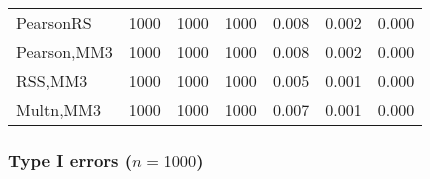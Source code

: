 \documentclass[
]{article}
\begin{document}
\begin{table}[H]
{\begin{tabular}[t]{lrrrrrr}
\hspace{1em}PearsonRS & 1000 & 1000 & 1000 & 0.008 & 0.002 & 0.000\\
\hspace{1em}Pearson,MM3 & 1000 & 1000 & 1000 & 0.008 & 0.002 & 0.000\\
\hspace{1em}RSS,MM3 & 1000 & 1000 & 1000 & 0.005 & 0.001 & 0.000\\
\hspace{1em}Multn,MM3 & 1000 & 1000 & 1000 & 0.007 & 0.001 & 0.000\\
\bottomrule
\end{tabular}}
\end{table}

\hypertarget{type-i-errors-n1000-3}{%
\subsubsection{\texorpdfstring{Type I errors
(\(n=1000\))}{Type I errors (n=1000)}}\label{type-i-errors-n1000-3}}
\end{document}

